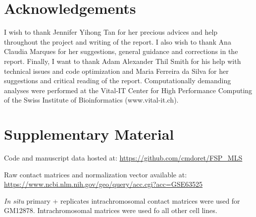 \documentclass[11pt,a4paper]{report}
\begin{document}
\section*{Acknowledgements}
I wish to thank Jennifer Yihong Tan for her precious advices and help throughout the project and writing of the report. I also wish to thank Ana Claudia Marques for her suggestions, general guidance and corrections in the report. Finally, I want to thank Adam Alexander Thil Smith for his help with technical issues and code optimization and Maria Ferreira da Silva for her suggestions and critical reading of the report.
Computationally demanding analyses were performed at the Vital-IT Center for High Performance Computing of the Swiss Institute of Bioinformatics (www.vital-it.ch).

\section*{Supplementary Material}
Code and manuscript data hosted at: \url{https://github.com/cmdoret/FSP_MLS}

\noindent Raw contact matrices and normalization vector available at: \url{https://www.ncbi.nlm.nih.gov/geo/query/acc.cgi?acc=GSE63525}

\noindent \textit{In situ} primary + replicates intrachromosomal contact matrices were used for GM12878. Intrachromosomal matrices were used fo all other cell lines.


\fancyhead[L]{\slshape }

\end{document}
